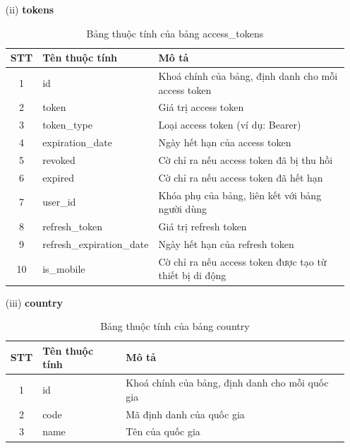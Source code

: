 \documentclass[../DoAn.tex]{subfiles}
\begin{document}
\begin{enumerate}
    \item[(ii)] \textbf{tokens}
    \begin{table}[H]
    \centering
        \begin{tabular}{|c|m{4cm}|m{8cm}|}
        \hline
        \textbf{STT} & \textbf{Tên thuộc tính} & \textbf{Mô tả} \\
        \hline
        1 & id & Khoá chính của bảng, định danh cho mỗi access token \\
        \hline
        2 & token & Giá trị access token \\
        \hline
        3 & token\_type & Loại access token (ví dụ: Bearer) \\
        \hline
        4 & expiration\_date & Ngày hết hạn của access token \\
        \hline
        5 & revoked & Cờ chỉ ra nếu access token đã bị thu hồi \\
        \hline
        6 & expired & Cờ chỉ ra nếu access token đã hết hạn \\
        \hline
        7 & user\_id & Khóa phụ của bảng, liên kết với bảng người dùng \\
        \hline
        8 & refresh\_token & Giá trị refresh token \\
        \hline
        9 & refresh\_expiration\_date & Ngày hết hạn của refresh token \\
        \hline
        10 & is\_mobile & Cờ chỉ ra nếu access token được tạo từ thiết bị di động \\
        \hline
        \end{tabular}
        \caption{Bảng thuộc tính của bảng access\_tokens}
        \label{tab:access_tokens_attributes}
    \end{table}

    \item[(iii)] \textbf{country}
    \begin{table}[H]
    \centering
        \begin{tabular}{|c|m{4cm}|m{8cm}|}
        \hline
        \textbf{STT} & \textbf{Tên thuộc tính} & \textbf{Mô tả} \\
        \hline
        1 & id & Khoá chính của bảng, định danh cho mỗi quốc gia \\
        \hline
        2 & code & Mã định danh của quốc gia \\
        \hline
        3 & name & Tên của quốc gia \\
        \hline
        \end{tabular}
        \caption{Bảng thuộc tính của bảng country}
        \label{tab:country_attributes}
    \end{table}


\end{enumerate}
\end{document}
